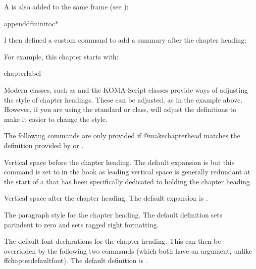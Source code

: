 \documentclass[fontsize=12pt]{scrbook}
\begin{document}
A  is also added to the same frame (see
):
\begin{codebox}
\gls{appenddfminitoc}*
\end{codebox}

I then defined a custom command to add a summary after the chapter
heading:
\begin{codebox}
\end{codebox}
For example, this chapter starts with:
\begin{codebox}
\gls{chapter}\gls{label}
\codepar
{}
\end{codebox}

Modern classes, such as  and the KOMA-Script classes
provide ways of adjusting the style of chapter headings. These can be
adjusted, as in the example above. However, if you are using the
standard  or  class,  will
adjust the definitions to make it easier to change the style.

\begin{important}
The following commands are only provided if \gls{@makechapterhead}
matches the definition provided by  or .
\end{important}

Vertical space before the chapter heading. The default expansion is
 but this command is set to  in 
the  hook as leading vertical
space is generally redundant at the start of a 
that has been specifically dedicated to holding the chapter heading.

Vertical space after the chapter heading. The default expansion is
.

The paragraph style for the chapter heading. The default definition
sets \gls{parindent} to zero and sets ragged right formatting.

The default font declarations for the chapter heading. This can then
be overridden by the following two commands (which both have an argument,
unlike \gls{ffchapterdefaultfont}). The default definition is
.
\end{document}
